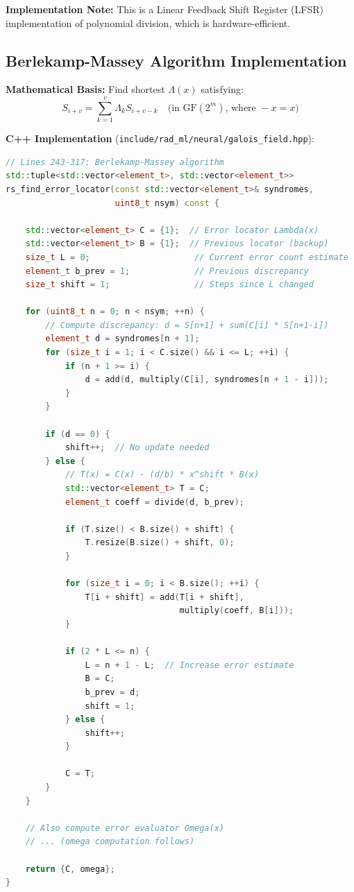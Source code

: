 \documentclass[11pt,a4paper]{article}
\begin{document}
\textbf{Implementation Note:} This is a Linear Feedback Shift Register (LFSR) implementation of polynomial division, which is hardware-efficient.

\subsection{Berlekamp-Massey Algorithm Implementation}

\textbf{Mathematical Basis:} Find shortest $\Lambda(x)$ satisfying:
\begin{equation}
S_{i+v} = \sum_{k=1}^v \Lambda_k S_{i+v-k} \quad \text{(in GF}(2^m)\text{, where } -x = x\text{)}
\end{equation}

\textbf{C++ Implementation} (\texttt{include/rad\_ml/neural/galois\_field.hpp}):
\begin{lstlisting}[language=C++, basicstyle=\small\ttfamily]
// Lines 243-317: Berlekamp-Massey algorithm
std::tuple<std::vector<element_t>, std::vector<element_t>>
rs_find_error_locator(const std::vector<element_t>& syndromes,
                      uint8_t nsym) const {

    std::vector<element_t> C = {1};  // Error locator Lambda(x)
    std::vector<element_t> B = {1};  // Previous locator (backup)
    size_t L = 0;                     // Current error count estimate
    element_t b_prev = 1;             // Previous discrepancy
    size_t shift = 1;                 // Steps since L changed

    for (uint8_t n = 0; n < nsym; ++n) {
        // Compute discrepancy: d = S[n+1] + sum(C[i] * S[n+1-i])
        element_t d = syndromes[n + 1];
        for (size_t i = 1; i < C.size() && i <= L; ++i) {
            if (n + 1 >= i) {
                d = add(d, multiply(C[i], syndromes[n + 1 - i]));
            }
        }

        if (d == 0) {
            shift++;  // No update needed
        } else {
            // T(x) = C(x) - (d/b) * x^shift * B(x)
            std::vector<element_t> T = C;
            element_t coeff = divide(d, b_prev);

            if (T.size() < B.size() + shift) {
                T.resize(B.size() + shift, 0);
            }

            for (size_t i = 0; i < B.size(); ++i) {
                T[i + shift] = add(T[i + shift],
                                   multiply(coeff, B[i]));
            }

            if (2 * L <= n) {
                L = n + 1 - L;  // Increase error estimate
                B = C;
                b_prev = d;
                shift = 1;
            } else {
                shift++;
            }

            C = T;
        }
    }

    // Also compute error evaluator Omega(x)
    // ... (omega computation follows)

    return {C, omega};
}
\end{lstlisting}
\end{document}
